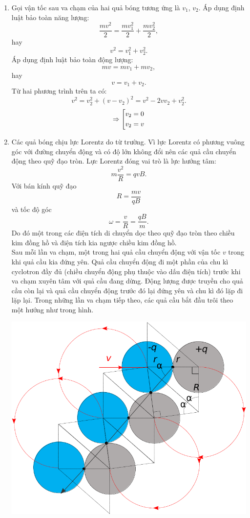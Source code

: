 \begin{loigiai}
\begin{enumerate}[1)]
    \item Gọi vận tốc sau va chạm của hai quả bóng tương ứng là $v_1$, $v_2$. Áp dụng định luật bảo toàn năng lượng:
    $$\dfrac{mv^2}{2}=\dfrac{mv_1^2}{2}+\dfrac{mv_2^2}{2},$$
    hay
    $$v^2=v_1^2+v_2^2.$$
    Áp dụng định luật bảo toàn động lượng:
    $$mv=mv_1+mv_2,$$
    hay 
    $$v=v_1+v_2.$$
    Từ hai phương trình trên ta có: 
    $$v^2=v_2^2+(v-v_2)^2=v^2-2vv_2+v_2^2.$$
    \[ \Rightarrow \left[ \begin{gathered}
      {v_2} = 0 \hfill \\
      {v_2} = v \hfill \\ 
    \end{gathered}  \right.\]
    \item Các quả bóng chịu lực Lorentz do từ trường. Vì lực Lorentz có phương vuông góc với đường chuyển động và có độ lớn không đổi nên các quả cầu chuyển động theo quỹ đạo tròn. Lực Lorentz đóng vai trò là lực hướng tâm: 
    $$m\dfrac{v^2}{R}=qvB.$$
    Với bán kính quỹ đạo $$R=\dfrac{mv}{qB}$$
    và tốc độ góc $$\omega=\dfrac{v}{R}=\dfrac{qB}{m}.$$
    Do đó một trong các điện tích di chuyển dọc theo quỹ đạo tròn theo chiều kim đồng hồ và điện tích kia ngược chiều kim đồng hồ.
    \\Sau mỗi lần va chạm, một trong hai quả cầu chuyển động với vận tốc $v$ trong khi quả cầu kia đứng yên. Quả cầu chuyển động đi một phần của chu kì cyclotron đầy đủ (chiều chuyển động phụ thuộc vào dấu điện tích) trước khi va chạm xuyên tâm với quả cầu đang dừng. Động lượng được truyền cho quả cầu còn lại và quả cầu chuyển động trước đó lại đứng yên và chu kì đó lặp đi lặp lại. Trong những lần va chạm tiếp theo, các quả cầu bắt đầu trôi theo một hướng như trong hình.
    \begin{center}
        \includegraphics[scale=0.75]{Anh/Trung1.pdf}

\end{center}
\end{enumerate}
\end{loigiai}
